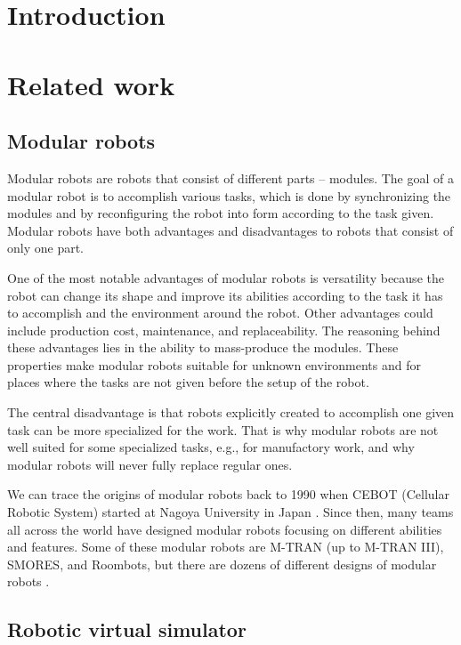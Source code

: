 \documentclass[
  digital, %
  table,   %
  oneside, %
  nolof,     %
  nolot,     %
]{fithesis3}
\begin{document}
\chapter*{Introduction}


\chapter{Related work}
\section{Modular robots}

Modular robots are robots that consist of different parts -- modules.
The goal of a modular robot is to accomplish various tasks, which is done by synchronizing the modules and by reconfiguring the robot into form according to the task given.
Modular robots have both advantages and disadvantages to robots that consist of only one part.

One of the most notable advantages of modular robots is versatility because the robot can change its shape and improve its abilities according to the task it has to accomplish and the environment around the robot.
Other advantages could include production cost, maintenance, and replaceability.
The reasoning behind these advantages lies in the ability to mass-produce the modules.
These properties make modular robots suitable for unknown environments and for places where the tasks are not given before the setup of the robot.

The central disadvantage is that robots explicitly created to accomplish one given task can be more specialized for the work.
That is why modular robots are not well suited for some specialized tasks, e.g., for manufactory work, and why modular robots will never fully replace regular ones.

We can trace the origins of modular robots back to 1990 when CEBOT (Cellular Robotic System) started at Nagoya University in Japan \cite{current-trends}.
Since then, many teams all across the world have designed modular robots focusing on different abilities and features.
Some of these modular robots are M-TRAN (up to M-TRAN III)\cite{mtran}, SMORES\cite{smores}, and Roombots\cite{roombots}, but there are dozens of different designs of modular robots \cite{current-trends}.

\section{Robotic virtual simulator}
\end{document}
